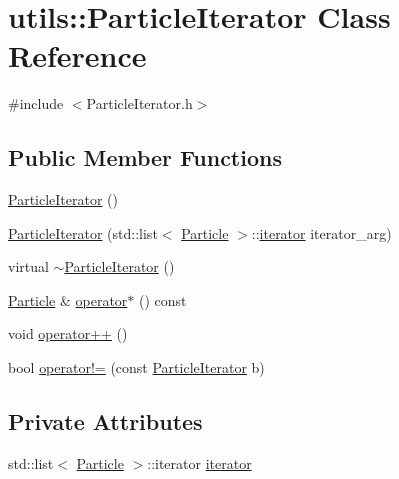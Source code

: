 \hypertarget{classutils_1_1ParticleIterator}{\section{utils\-:\-:Particle\-Iterator Class Reference}
\label{classutils_1_1ParticleIterator}
}


{\ttfamily \#include $<$Particle\-Iterator.\-h$>$}

\subsection*{Public Member Functions}
\begin{DoxyCompactItemize}
\item 
\hyperlink{classutils_1_1ParticleIterator_a85f9b149311eccc93a879f9b464df53d}{Particle\-Iterator} ()
\item 
\hyperlink{classutils_1_1ParticleIterator_a428eeba8c1da0b9a3ff2357188e3b021}{Particle\-Iterator} (std\-::list$<$ \hyperlink{classParticle}{Particle} $>$\-::\hyperlink{classutils_1_1ParticleIterator_a2e8cdcdcf26e9a8e18e8f524d43531fc}{iterator} iterator\-\_\-arg)
\item 
virtual \hyperlink{classutils_1_1ParticleIterator_aef1f2f8efd52a310ab74a8ee36b20f69}{$\sim$\-Particle\-Iterator} ()
\item 
\hyperlink{classParticle}{Particle} \& \hyperlink{classutils_1_1ParticleIterator_a4e6db61f5439f9ce191e8c15a58c073e}{operator$\ast$} () const 
\item 
void \hyperlink{classutils_1_1ParticleIterator_a9cc01509552913bcffc4b7b6f3d3ddcd}{operator++} ()
\item 
bool \hyperlink{classutils_1_1ParticleIterator_a04170160a43b10cb35a4affd1e44c76a}{operator!=} (const \hyperlink{classutils_1_1ParticleIterator}{Particle\-Iterator} b)
\end{DoxyCompactItemize}
\subsection*{Private Attributes}
\begin{DoxyCompactItemize}
\item 
std\-::list$<$ \hyperlink{classParticle}{Particle} $>$\-::iterator \hyperlink{classutils_1_1ParticleIterator_a2e8cdcdcf26e9a8e18e8f524d43531fc}{iterator}
\end{DoxyCompactItemize}


